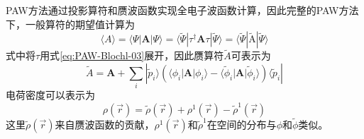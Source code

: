 {%
\textrm{PAW}方法通过投影算符和赝波函数实现全电子波函数计算，因此完整的\textrm{PAW}方法下，一般算符的期望值计算为
\begin{equation}
	\langle A \rangle=\langle\Psi|\mathbf{A}|\Psi\rangle=\langle\tilde\Psi|\tau^{\dag}\mathbf{A}\tau|\tilde\Psi\rangle=\langle\tilde\Psi|\tilde{\mathrm{A}}|\tilde\Psi\rangle
	\label{eq:PAW-Blochl-04}
\end{equation}
式中将$\tau$用式\eqref{eq:PAW-Blochl-03}展开，因此赝算符$\tilde A$可表示为
\begin{equation}
	\tilde A=\mathbf{A}+\sum_i|\tilde p_i\rangle(\langle\phi_i|\mathbf{A}|\phi_i\rangle-\langle\tilde\phi_i|\mathbf{A}|\tilde\phi_i\rangle)\langle\tilde p_i|
	\label{eq:PAW-Blochl-05}
\end{equation}
电荷密度可以表示为
\begin{equation}
	\rho(\vec r)=\tilde \rho(\vec r)+\rho^1(\vec r)-\tilde\rho^1(\vec r)
	\label{eq:PAW-Blochl-07}
\end{equation}
这里$\tilde\rho(\vec r)$来自赝波函数的贡献，$\rho^1(\vec r)$和$\tilde\rho^1$在空间的分布与$\phi$和$\tilde\phi$类似。

}
